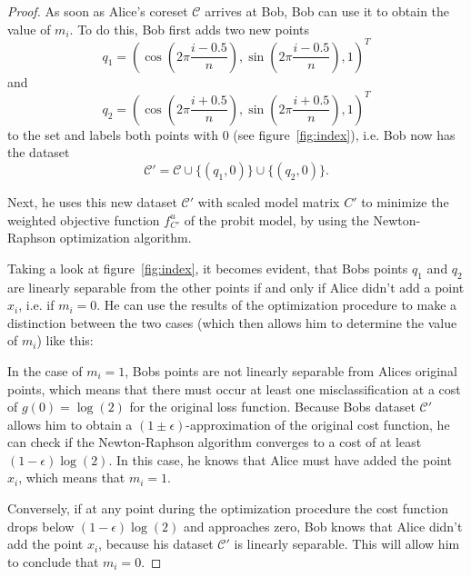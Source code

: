 \begin{proof}
    As soon as Alice's coreset $\mathcal{C}$ arrives at Bob,
    Bob can use it to obtain the value of $m_i$.
    To do this, Bob first adds two new points
    \begin{equation*}
        q_1 = \left( \cos{\left(2 \pi \frac{i - 0.5}{n}\right)},
        \sin{\left(2 \pi \frac{i - 0.5}{n}\right)}, 1 \right)^T
    \end{equation*}
    and
    \begin{equation*}
        q_2 = \left( \cos{\left(2 \pi \frac{i + 0.5}{n}\right)},
        \sin{\left(2 \pi \frac{i + 0.5}{n}\right)}, 1 \right)^T
    \end{equation*}
    to the set and labels both points with $0$ (see figure~\ref{fig:index}),
    i.e. Bob now has the dataset
    \begin{equation*}
        \mathcal{C}' = \mathcal{C} \cup \{(q_1, 0)\} \cup \{(q_2, 0)\}.
    \end{equation*}

    Next, he uses this new dataset $\mathcal{C}'$ with
    scaled model matrix $C'$ to
    minimize the weighted objective function
    $f_{C'}^u$ of the probit model,
    by using the Newton-Raphson optimization algorithm.

    Taking a look at figure~\ref{fig:index}, it becomes evident,
    that Bobs points $q_1$ and $q_2$ are linearly separable from
    the other points if and only if Alice didn't add a point
    $x_i$, i.e. if $m_i = 0$.
    He can use the results of the optimization procedure to
    make a distinction between the two cases
    (which then allows him to determine the value of $m_i$)
    like this:

    In the case of $m_i=1$, Bobs points are not linearly separable from
    Alices original points, which means that there must occur at least one
    misclassification at a cost of $g(0) = \log(2)$ for the original
    loss function.
    Because Bobs dataset $\mathcal{C}'$ allows him to obtain a
    $(1 \pm \epsilon)$-approximation of the original cost function, he can
    check if the Newton-Raphson algorithm converges to
    a cost of at least $(1 - \epsilon) \log(2)$.
    In this case, he knows that Alice must have added the point $x_i$,
    which means that $m_i=1$.

    Conversely, if at any point during the optimization procedure
    the cost function drops below
    $(1 - \epsilon) \log(2)$
    and approaches zero, Bob knows that Alice didn't add the point
    $x_i$, because his dataset $\mathcal{C}'$ is linearly separable.
    This will allow him to conclude that $m_i = 0$.


\end{proof}
